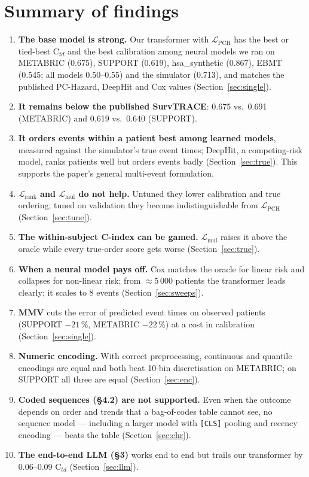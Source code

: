 \documentclass[11pt,a4paper]{article}
\newcommand{\Lpch}{$\mathcal{L}_{\mathrm{PCH}}$}
\newcommand{\Lrank}{$\mathcal{L}_{\mathrm{rank}}$}
\newcommand{\Lmul}{$\mathcal{L}_{\mathrm{mul}}$}
\newcommand{\Ctd}{C$_{td}$}
\begin{document}
\section*{Summary of findings}
\begin{enumerate}
  \item \textbf{The base model is strong.} Our transformer with \Lpch{} has the best or tied-best \Ctd{} and the
        best calibration among neural models we ran on METABRIC (0.675), SUPPORT (0.619), hsa\_synthetic (0.867), EBMT
        (0.545; all models 0.50--0.55) and the simulator (0.713), and matches the published PC-Hazard, DeepHit and Cox values (Section~\ref{sec:single}).
  \item \textbf{It remains below the published SurvTRACE}: 0.675 vs.\ 0.691 (METABRIC) and 0.619 vs.\ 0.640 (SUPPORT).
  \item \textbf{It orders events within a patient best among learned models}, measured against the simulator's true
        event times; DeepHit, a competing-risk model, ranks patients well but orders events badly
        (Section~\ref{sec:true}). This supports the paper's general multi-event formulation.
  \item \textbf{\Lrank{} and \Lmul{} do not help.} Untuned they lower calibration and true ordering; tuned on
        validation they become indistinguishable from \Lpch{} (Section~\ref{sec:tune}).
  \item \textbf{The within-subject C-index can be gamed.} \Lmul{} raises it above the oracle while every true-order
        score gets worse (Section~\ref{sec:true}).
  \item \textbf{When a neural model pays off.} Cox matches the oracle for linear risk and collapses for non-linear
        risk; from $\approx$5\,000 patients the transformer leads clearly; it scales to 8 events (Section~\ref{sec:sweeps}).
  \item \textbf{MMV} cuts the error of predicted event times on observed patients (SUPPORT $-21\,\%$, METABRIC
        $-22\,\%$) at a cost in calibration (Section~\ref{sec:single}).
  \item \textbf{Numeric encoding.} With correct preprocessing, continuous and quantile encodings are equal and both
        beat 10-bin discretisation on METABRIC; on SUPPORT all three are equal (Section~\ref{sec:enc}).
  \item \textbf{Coded sequences (\S4.2) are not supported.} Even when the outcome depends on order and trends that a
        bag-of-codes table cannot see, no sequence model --- including a larger model with \texttt{[CLS]} pooling
        and recency encoding --- beats the table (Section~\ref{sec:ehr}).
  \item \textbf{The end-to-end LLM (\S3)} works end to end but trails our transformer by 0.06--0.09 \Ctd{}
        (Section~\ref{sec:llm}).
\end{enumerate}
\end{document}
